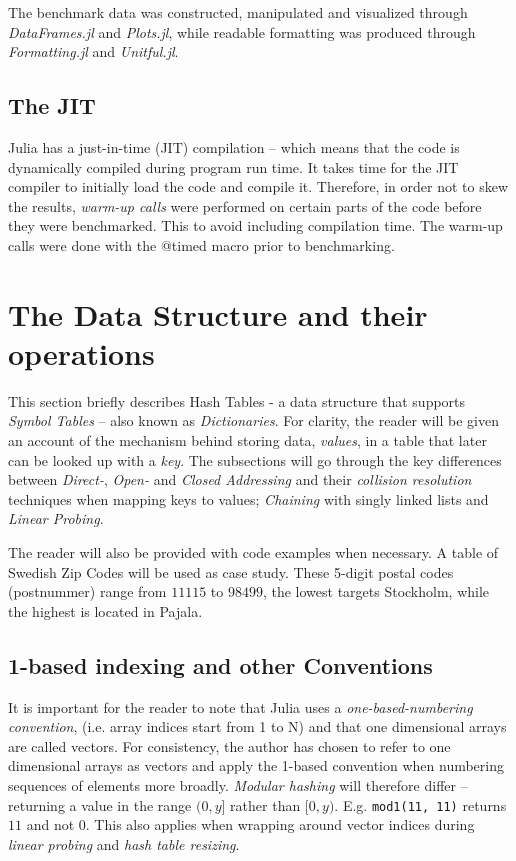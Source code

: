 \documentclass[a4paper, 11pt]{article}
\begin{document}
    The benchmark data was constructed, manipulated and visualized through
    \emph{DataFrames.jl} and \emph{Plots.jl}, 
    while readable formatting was produced through 
    \emph{Formatting.jl} and \emph{Unitful.jl}. 

    \subsection*{The JIT}
    Julia has a just-in-time (JIT) compilation -- which means that the code is
    dynamically compiled during program run time.     
    It takes time for the JIT compiler to 
    initially load the code and compile it. Therefore, in order not to skew the
    results, \emph{warm-up calls} were performed on certain parts of the code
    before they were benchmarked. This to avoid including 
    compilation time. The warm-up calls were done with the @timed macro prior to
    benchmarking.

    \section*{The Data Structure and their operations} %
    This section briefly describes Hash Tables - a data structure that supports
    \emph{Symbol Tables} -- also known as \emph{Dictionaries}. 
    For clarity, the reader will be given an account of the mechanism 
    behind storing data, \emph{values}, in a table 
    that later can be looked up with a \emph{key}. 
    The subsections will go through the key differences between 
    \emph{Direct-}, \emph{Open-} and \emph{Closed Addressing} and their
    \emph{collision resolution} techniques when mapping keys to values; 
    \emph{Chaining} with singly linked lists
    and \emph{Linear Probing}. 
    
    The reader will also be provided with code examples when necessary. 
    A table of Swedish Zip Codes will be used as case study. These
    5-digit postal codes (postnummer) range from $11115$ to $98499$, the lowest
    targets Stockholm, while the highest is located in Pajala. 
    
    \subsection*{1-based indexing and other Conventions}
    \label{subsec:convensions}
    It is important for the reader to note that Julia uses a \emph{one-based-numbering
    convention}, (i.e. array indices start from 1 to N) and that one dimensional
    arrays are called vectors.  
    For consistency, the author has chosen to refer to one dimensional
    arrays as vectors and apply the 1-based convention when numbering
    sequences of elements more broadly. \emph{Modular hashing} 
    will therefore differ -- 
    returning a value in the range $(0,y]$ rather than $[0,y)$. E.g.
    \texttt{mod1(11, 11)} returns $11$ and not $0$. This also
    applies when wrapping around vector indices during \emph{linear probing}
    and \emph{hash table resizing}.
        
\end{document}

